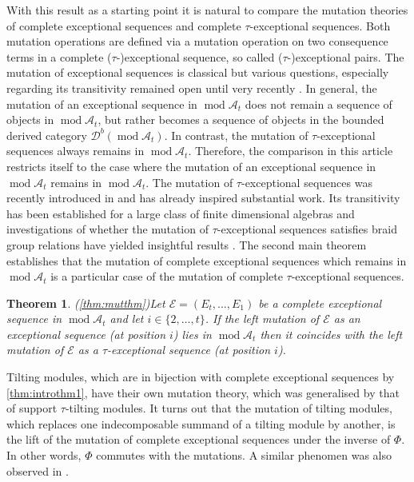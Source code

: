 \documentclass[10pt,twoside, a4paper,reqno]{amsart}
\DeclareMathOperator{\mods}{mod}
\newcommand{\A}{\mathscr{A}}
\newcommand{\Dcal}{\mathcal{D}}
\newcommand{\Ecal}{\mathcal{E}}
\newtheorem{theorem}{Theorem}[section]
\theoremstyle{definition}
\begin{document}
With this result as a starting point it is natural to compare the mutation theories of complete exceptional sequences and complete $\tau$-exceptional sequences. Both mutation operations are defined via a mutation operation on two consequence terms in a complete ($\tau$-)exceptional sequence, so called ($\tau$-)exceptional pairs. The mutation of exceptional sequences is classical but various questions, especially regarding its transitivity remained open until very recently \cite{CHS2025}. In general, the mutation of an exceptional sequence in $\mods \A_t$ does not remain a sequence of objects in $\mods \A_t$, but rather becomes a sequence of objects in the bounded derived category $\Dcal^b(\mods \A_t)$. In contrast, the mutation of $\tau$-exceptional sequences always remains in $\mods \A_t$. Therefore, the comparison in this article restricts itself to the case where the mutation of an exceptional sequence in $\mods \A_t$ remains in $\mods \A_t$. The mutation of $\tau$-exceptional sequences was recently introduced in \cite{BHM2024} and has already inspired substantial work. Its transitivity has been established for a large class of finite dimensional algebras \cite{BHM2025} and investigations of whether the mutation of $\tau$-exceptional sequences satisfies braid group relations have yielded insightful results \cite{KaipelTerland2025, Nonis2025b}. The second main theorem establishes that the mutation of complete exceptional sequences which remains in $\mods \A_t$ is a particular case of the mutation of complete $\tau$-exceptional sequences. 



\begin{theorem}(\cref{thm:mutthm})\label{thm:introthm2}
    Let $\Ecal= (E_t, \dots, E_1)$ be a complete exceptional sequence in $\mods \A_t$ and let $i \in \{2, \dots, t\}$. If the left mutation of $\Ecal$ as an exceptional sequence (at position $i$) lies in $\mods \A_t$ then it coincides with the left mutation of $\Ecal$ as a $\tau$-exceptional sequence (at position $i$).
\end{theorem}


Tilting modules, which are in bijection with complete exceptional sequences by \cref{thm:introthm1}, have their own mutation theory, which was generalised by that of support $\tau$-tilting modules. It turns out that the mutation of tilting modules, which replaces one indecomposable summand of a tilting module by another, is the lift of the mutation of complete exceptional sequences under the inverse of $\Phi$. In other words, $\Phi$ commutes with the mutations. A similar phenomen was also observed in \cite[Sec. 9]{Geuenich2022}.
\end{document}
